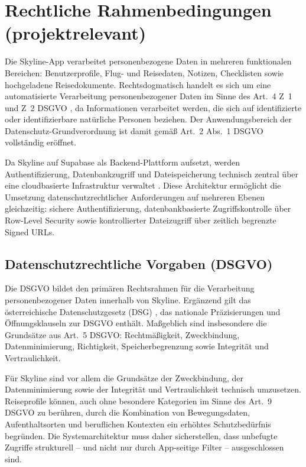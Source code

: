 
\section{Rechtliche Rahmenbedingungen (projektrelevant)}\label{sec:recht}

Die Skyline-App verarbeitet personenbezogene Daten in mehreren funktionalen
Bereichen: Benutzerprofile, Flug- und Reisedaten, Notizen, Checklisten sowie
hochgeladene Reisedokumente.
Rechtsdogmatisch handelt es sich um eine automatisierte Verarbeitung
personenbezogener Daten im Sinne des Art.~4 Z~1 und Z~2 DSGVO
\cite{gdpr}, da Informationen verarbeitet werden, die sich auf identifizierte
oder identifizierbare natürliche Personen beziehen.
Der Anwendungsbereich der Datenschutz-Grundverordnung ist damit gemäß
Art.~2 Abs.~1 DSGVO vollständig eröffnet.

Da Skyline auf Supabase als Backend-Plattform aufsetzt, werden Authentifizierung,
Datenbankzugriff und Dateispeicherung technisch zentral über eine
cloudbasierte Infrastruktur verwaltet \cite{supabasePlatform}.
Diese Architektur ermöglicht die Umsetzung datenschutzrechtlicher Anforderungen
auf mehreren Ebenen gleichzeitig: sichere Authentifizierung, datenbankbasierte
Zugriffskontrolle über Row-Level Security sowie kontrollierter Dateizugriff
über zeitlich begrenzte Signed URLs.

\subsection{Datenschutzrechtliche Vorgaben (DSGVO)}

Die DSGVO \cite{gdpr} bildet den primären Rechtsrahmen für die Verarbeitung
personenbezogener Daten innerhalb von Skyline.
Ergänzend gilt das österreichische Datenschutzgesetz (DSG) \cite{dsg},
das nationale Präzisierungen und Öffnungsklauseln zur DSGVO enthält.
Maßgeblich sind insbesondere die Grundsätze aus Art.~5 DSGVO:
Rechtmäßigkeit, Zweckbindung, Datenminimierung, Richtigkeit,
Speicherbegrenzung sowie Integrität und Vertraulichkeit.

Für Skyline sind vor allem die Grundsätze der Zweckbindung,
der Datenminimierung sowie der Integrität und Vertraulichkeit
technisch umzusetzen.
Reiseprofile können, auch ohne besondere Kategorien im Sinne des Art.~9 DSGVO
zu berühren, durch die Kombination von Bewegungsdaten, Aufenthaltsorten
und beruflichen Kontexten ein erhöhtes Schutzbedürfnis begründen.
Die Systemarchitektur muss daher sicherstellen, dass unbefugte Zugriffe
strukturell -- und nicht nur durch App-seitige Filter -- ausgeschlossen sind.

